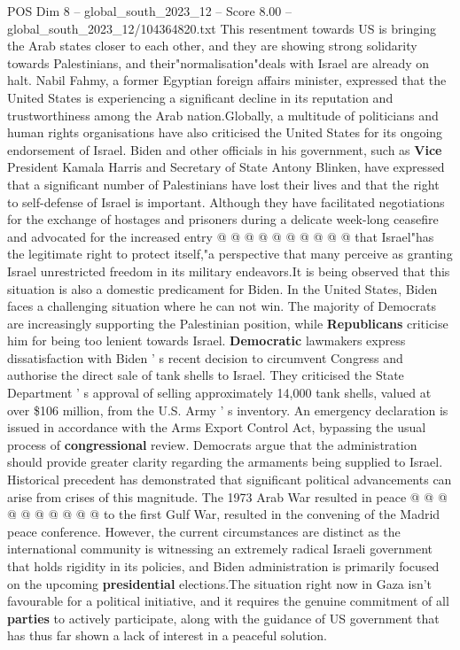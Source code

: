 \begin{textsample}{POS Dim 8 – global\_south\_2023\_12 – Score 8.00 – global\_south\_2023\_12/104364820.txt}
This resentment towards US is bringing the Arab states closer to each other, and they are showing strong solidarity towards Palestinians, and their"normalisation"deals with Israel are already on halt.
Nabil Fahmy, a former Egyptian foreign affairs minister, expressed that the United States is experiencing a significant decline in its reputation and trustworthiness among the Arab nation.Globally, a multitude of politicians and human rights organisations have also criticised the United States for its ongoing endorsement of Israel.
Biden and other officials in his government, such as \textbf{Vice} President Kamala Harris and Secretary of State Antony Blinken, have expressed that a significant number of Palestinians have lost their lives and that the right to self-defense of Israel is important.
Although they have facilitated negotiations for the exchange of hostages and prisoners during a delicate week-long ceasefire and advocated for the increased entry @ @ @ @ @ @ @ @ @ @ that Israel"has the legitimate right to protect itself,"a perspective that many perceive as granting Israel unrestricted freedom in its military endeavors.It is being observed that this situation is also a domestic predicament for Biden.
In the United States, Biden faces a challenging situation where he can not win.
The majority of Democrats are increasingly supporting the Palestinian position, while \textbf{Republicans} criticise him for being too lenient towards Israel. \textbf{Democratic} lawmakers express dissatisfaction with Biden ' s recent decision to circumvent Congress and authorise the direct sale of tank shells to Israel.
They criticised the State Department ' s approval of selling approximately 14,000 tank shells, valued at over \$106 million, from the U.S.
Army ' s inventory.
An emergency declaration is issued in accordance with the Arms Export Control Act, bypassing the usual process of \textbf{congressional} review.
Democrats argue that the administration should provide greater clarity regarding the armaments being supplied to Israel.
Historical precedent has demonstrated that significant political advancements can arise from crises of this magnitude.
The 1973 Arab War resulted in peace @ @ @ @ @ @ @ @ @ @ to the first Gulf War, resulted in the convening of the Madrid peace conference.
However, the current circumstances are distinct as the international community is witnessing an extremely radical Israeli government that holds rigidity in its policies, and Biden administration is primarily focused on the upcoming \textbf{presidential} elections.The situation right now in Gaza isn't favourable for a political initiative, and it requires the genuine commitment of all \textbf{parties} to actively participate, along with the guidance of US government that has thus far shown a lack of interest in a peaceful solution.

\end{textsample}
